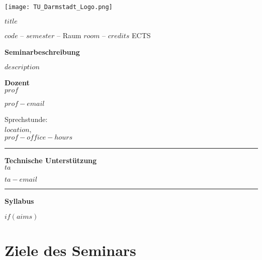 \documentclass[11pt,a4paper]{article}
\author{$prof$}
\begin{document}
\hspace*{-1.25cm}
\texttt{[image: TU\_Darmstadt\_Logo.png]}
\vspace{0.25cm}

\begin{minipage}[t][58mm][t]{0.55\textwidth}

\textbf{\textcolor{TUColor}{$title$}}

$code$ -- $semester$ -- Raum $room$ -- $credits$ ECTS
\vspace{0.25cm}

\textbf{\textcolor{TUColor}{Seminarbeschreibung}}

$description$

\vspace{0.25cm}

\fontsize{8}{10}{\textbf{\textcolor{TUColor}{$program$}}}

\vspace{0.25cm}
	\end{minipage}%
	\hspace{0.5cm}\vrule{}\hspace{0.5cm}
	\begin{minipage}[t][75mm][t]{0.37\textwidth}
	\begin{minipage}[t][37mm][t]{\textwidth}
	\textbf{Dozent}\\
	
	$prof$
	
	\vspace{0.1cm}
	$prof-email$
	\vspace{0.1cm}
	
Sprechstunde: \\
$location$,\\
$prof-office-hours$
	
	\end{minipage}
	\vspace{1cm}\hrule{}\vspace{0.5cm}
	\begin{minipage}[t][28mm][t]{\textwidth}
	\textbf{Technische Unterstützung}\\
	
	$ta$

	\vspace{0.1cm}
	$ta-email$

	\end{minipage}
	\end{minipage}
	\hrule{}
	
\textbf{\textcolor{TUColor}{Syllabus}}	

$if(aims)$\section*{Ziele des Seminars}
\end{document}
